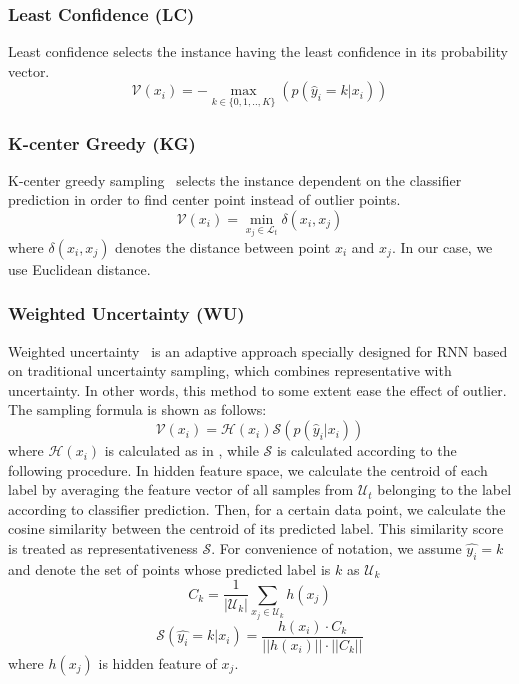 \subsubsection{Least Confidence (LC)}
    Least confidence selects the instance having the least confidence in its probability vector.
    \begin{equation}
    \mathcal{V}(x_i) = - \max_{k \in \{0,1,..,K\}}(p(\hat{y}_i=k|x_i)) 
    \end{equation}
    

\subsubsection{K-center Greedy (KG)}
    K-center greedy sampling~\cite{sener2017geometric} selects the instance dependent on the classifier prediction in order to find center point instead of outlier points.
    \begin{equation}
        \mathcal{V}(x_i) = \min_{x_j \in \mathcal{L}_t}\delta(x_i,x_j)
    \end{equation}
    where $\delta(x_i,x_j)$ denotes the distance between point $x_i$ and $x_j$. In our case, we use Euclidean distance.
    
\subsubsection{Weighted Uncertainty (WU)}
    Weighted uncertainty~\cite{zhao2017deep} is an adaptive approach specially designed for RNN based on traditional uncertainty sampling, which combines representative with uncertainty. In other words, this method to some extent ease the effect of outlier. The sampling formula is shown as follows:
    \begin{equation}
    \mathcal{V}(x_i) = \mathcal{H}(x_i) \mathcal{S}(p(\hat{y}_i|x_i))
    \end{equation}
    where $\mathcal{H}(x_i)$ is calculated as in , while $\mathcal{S}$ is calculated according to the following procedure. 
    In hidden feature space, we calculate the centroid of each label by averaging the feature vector of all samples from $\mathcal{U}_t$ belonging to the label according to classifier prediction. Then, for a certain data point, we calculate the cosine similarity between the centroid of its predicted label. This similarity score is treated as representativeness $\mathcal{S}$.  For convenience of notation, we assume $\hat{y_i} = k$ and denote the set of points whose predicted label is $k$ as $\mathcal{U}_k$
    \begin{equation}
    C_k = \frac{1}{|\mathcal{U}_k|} \sum_{x_j \in \mathcal{U}_k} h(x_j)
    \end{equation}
    \begin{equation}
    \mathcal{S}(\hat{y_i} = k|x_i) = \frac{h(x_i) \cdot C_k}{||h(x_i)|| \cdot ||C_k||}         
    \end{equation}
where $h(x_j)$ is hidden feature of $x_j$.

